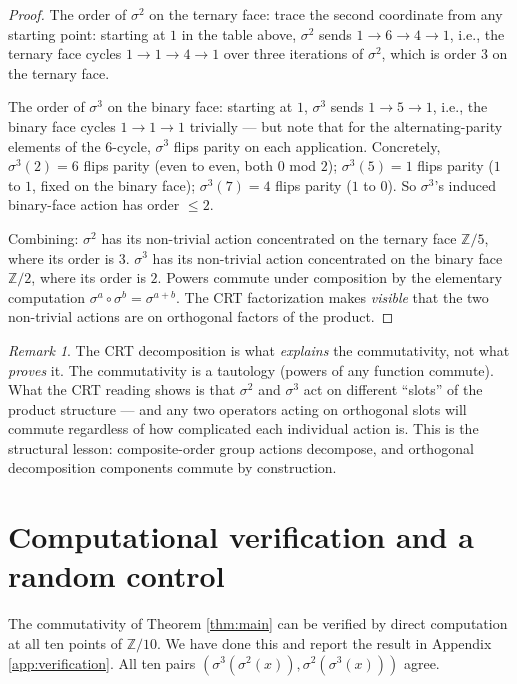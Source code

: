 \documentclass[11pt]{article}
\theoremstyle{plain}
\theoremstyle{definition}
\theoremstyle{remark}
\newtheorem*{remark}{Remark}
\begin{document}
\begin{proof}
The order of $\sigma^2$ on the ternary face: trace the second coordinate from any starting point: starting at $1$ in the table above, $\sigma^2$ sends $1 \to 6 \to 4 \to 1$, i.e., the ternary face cycles $1 \to 1 \to 4 \to 1$ over three iterations of $\sigma^2$, which is order $3$ on the ternary face.

The order of $\sigma^3$ on the binary face: starting at $1$, $\sigma^3$ sends $1 \to 5 \to 1$, i.e., the binary face cycles $1 \to 1 \to 1$ trivially --- but note that for the alternating-parity elements of the $6$-cycle, $\sigma^3$ flips parity on each application. Concretely, $\sigma^3(2) = 6$ flips parity (even to even, both $0$ mod $2$); $\sigma^3(5) = 1$ flips parity ($1$ to $1$, fixed on the binary face); $\sigma^3(7) = 4$ flips parity ($1$ to $0$). So $\sigma^3$'s induced binary-face action has order $\le 2$.

Combining: $\sigma^2$ has its non-trivial action concentrated on the ternary face $\mathbb{Z}/5$, where its order is $3$. $\sigma^3$ has its non-trivial action concentrated on the binary face $\mathbb{Z}/2$, where its order is $2$. Powers commute under composition by the elementary computation $\sigma^a \circ \sigma^b = \sigma^{a+b}$. The CRT factorization makes \emph{visible} that the two non-trivial actions are on orthogonal factors of the product.
\end{proof}

\begin{remark}
The CRT decomposition is what \emph{explains} the commutativity, not what \emph{proves} it. The commutativity is a tautology (powers of any function commute). What the CRT reading shows is that $\sigma^2$ and $\sigma^3$ act on different ``slots'' of the product structure --- and any two operators acting on orthogonal slots will commute regardless of how complicated each individual action is. This is the structural lesson: composite-order group actions decompose, and orthogonal decomposition components commute by construction.
\end{remark}

\section{Computational verification and a random control}

The commutativity of Theorem \ref{thm:main} can be verified by direct computation at all ten points of $\mathbb{Z}/10$. We have done this and report the result in Appendix \ref{app:verification}. All ten pairs $(\sigma^3(\sigma^2(x)), \sigma^2(\sigma^3(x)))$ agree.
\end{document}
